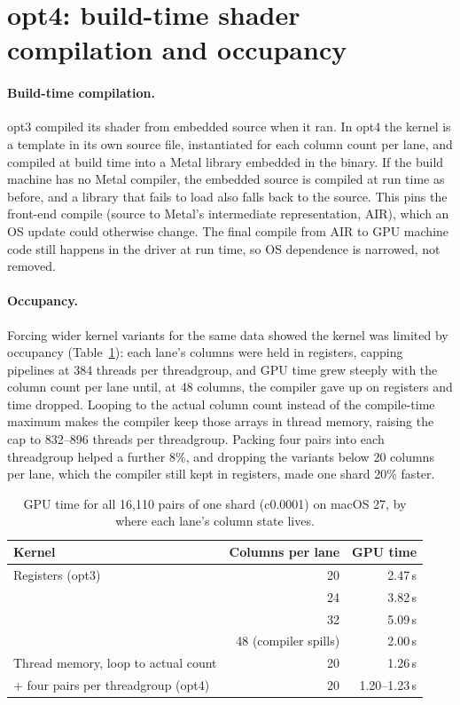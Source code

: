 \documentclass[11pt]{article}
\begin{document}
\section{opt4: build-time shader compilation and occupancy}
\label{sec:opt4}

\paragraph{Build-time compilation.} opt3 compiled its shader from embedded source when it ran.
In opt4 the kernel is a template in its own source file, instantiated for each column
count per lane, and compiled at build time into a Metal library embedded in the binary.
If the build machine has no Metal compiler, the embedded source is compiled at run time
as before, and a library that fails to load also falls back to the source. This pins the
front-end compile (source to Metal's intermediate representation, AIR), which an OS update
could otherwise change. The final compile from AIR to GPU machine code still happens in
the driver at run time, so OS dependence is narrowed, not removed.

\paragraph{Occupancy.} Forcing wider kernel variants for the same data showed the kernel was
limited by occupancy (Table~\ref{tab:occupancy}): each lane's columns were held in registers,
capping pipelines at 384 threads per threadgroup, and GPU time grew steeply with the column
count per lane until, at 48 columns, the compiler gave up on registers and time dropped.
Looping to the actual column count instead of the compile-time maximum makes the compiler
keep those arrays in thread memory, raising the cap to 832--896 threads per threadgroup.
Packing four pairs into each threadgroup helped a further 8\%, and dropping the variants below
20 columns per lane, which the compiler still kept in registers, made one shard 20\% faster.

\begin{table}[h]
\centering
\caption{GPU time for all 16{,}110 pairs of one shard (c0.0001) on macOS 27, by where
each lane's column state lives.}
\label{tab:occupancy}
\begin{tabular}{lrr}
\toprule
Kernel & Columns per lane & GPU time \\
\midrule
Registers (opt3) & 20 & 2.47\,s \\
                 & 24 & 3.82\,s \\
                 & 32 & 5.09\,s \\
                 & 48 (compiler spills) & 2.00\,s \\
Thread memory, loop to actual count & 20 & 1.26\,s \\
\quad + four pairs per threadgroup (opt4) & 20 & 1.20--1.23\,s \\
\bottomrule
\end{tabular}
\end{table}
\end{document}
